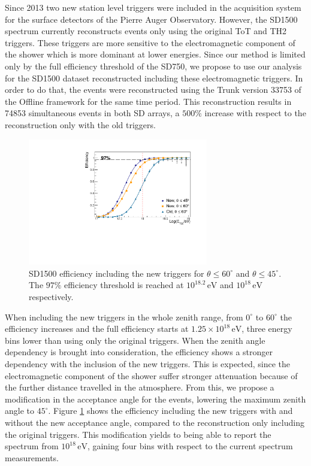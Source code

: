 \documentclass[12pt,a4paper]{article}
\newcommand{\eV}{\, \mathrm{eV}}
\begin{document}
Since 2013 two new station level triggers were included in the acquisition system for the surface detectors of the Pierre Auger Observatory. However, the SD1500 spectrum currently reconstructs events only using the original ToT and TH2 triggers. These triggers are more sensitive to the electromagnetic component of the shower which is more dominant at lower energies. Since our method is limited only by the full efficiency threshold of the SD750, we propose to use our analysis for the SD1500 dataset reconstructed including these electromagnetic triggers.
In order to do that, the events were reconstructed using the Trunk version 33753 of the Offline framework for the same time period. This reconstruction results in 74853 simultaneous events in both SD arrays, a $500\%$ increase with respect to the reconstruction only with the old triggers.

\begin{figure}[h]
    \begin{center}
        \includegraphics[width=0.7\textwidth]{plots/NewCut.pdf}
        \caption{SD1500 efficiency including the new triggers for $\theta\leq60^\circ$ and $\theta\leq45^\circ$. The $97\%$ efficiency threshold is reached at $10^{18.2}\eV$ and $10^{18}\eV$ respectively.
        \label{fig:NewCut}}
        \vspace{-0.5cm}
    \end{center}
\end{figure}

When including the new triggers in the whole zenith range, from $0^{\circ}$ to $60^{\circ}$ the efficiency increases and the full efficiency starts at $1.25\times10^{18}\eV$, three energy bins lower than using only the original triggers. When the zenith angle dependency is brought into consideration, the efficiency shows a stronger dependency with the inclusion of the new triggers. This is expected, since the electromagnetic component of the shower suffer stronger attenuation because of the further distance travelled in the atmosphere. From this, we propose a modification in the acceptance angle for the events, lowering the maximum zenith angle to $45^{\circ}$. Figure \ref{fig:NewCut} shows the efficiency including the new triggers with and without the new acceptance angle, compared to the reconstruction only including the original triggers. This modification yields to being able to report the spectrum from $10^{18}\eV$, gaining four bins with respect to the current spectrum measurements.
\end{document}
